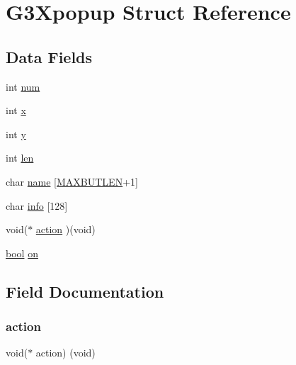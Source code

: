 \hypertarget{struct_g3_xpopup}{}\section{G3\+Xpopup Struct Reference}
\label{struct_g3_xpopup}
\subsection*{Data Fields}
\begin{DoxyCompactItemize}
\item 
int \hyperlink{struct_g3_xpopup_a86cf672daa4e0ad11ad10efc894d19c8}{num}
\item 
int \hyperlink{struct_g3_xpopup_a6150e0515f7202e2fb518f7206ed97dc}{x}
\item 
int \hyperlink{struct_g3_xpopup_a0a2f84ed7838f07779ae24c5a9086d33}{y}
\item 
int \hyperlink{struct_g3_xpopup_afed088663f8704004425cdae2120b9b3}{len}
\item 
char \hyperlink{struct_g3_xpopup_aa998d085055b9e9634ea1781cc0163c7}{name} \mbox{[}\hyperlink{g3x__switch_8c_a0e40ba0c0da54aafd8c34999455ec4fa}{M\+A\+X\+B\+U\+T\+L\+EN}+1\mbox{]}
\item 
char \hyperlink{struct_g3_xpopup_aef383a8ccd6a48889b57cb6ceb7091f6}{info} \mbox{[}128\mbox{]}
\item 
void($\ast$ \hyperlink{struct_g3_xpopup_a40c8103d8ace16fc3e34e828fc8bca0b}{action} )(void)
\item 
\hyperlink{g3x__types_8h_af6a258d8f3ee5206d682d799316314b1}{bool} \hyperlink{struct_g3_xpopup_aaa928c9a62449f7946da1e32f66c70d2}{on}
\end{DoxyCompactItemize}


\subsection{Field Documentation}
\mbox{\label{struct_g3_xpopup_a40c8103d8ace16fc3e34e828fc8bca0b}} 
\subsubsection{\texorpdfstring{action}{action}}
{\footnotesize\ttfamily void($\ast$ action) (void)}

\mbox{\label{struct_g3_xpopup_aef383a8ccd6a48889b57cb6ceb7091f6}} 
